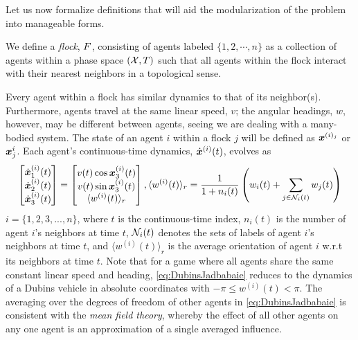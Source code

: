 Let us now formalize definitions that will aid the modularization of the problem into manageable forms.
%
\begin{definition}
	We define a \textit{flock}, $F$, consisting of agents labeled $\{1, 2, \cdots, n\}$  as a collection of agents within a phase space $(\mathcal{X}, T)$ such that all agents within the flock interact with their nearest neighbors in a topological sense.
	\label{def:flock}
\end{definition}
%
\begin{remark}
	Every agent within a flock has similar dynamics to that of its neighbor(s). Furthermore, agents travel at the same linear speed, $v$; the angular headings, $w$, however, may be different between agents, seeing we are dealing with a many-bodied system. The state of an agent $i$ within a flock $j$ will be defined as $\bm{x}^{(i)_j}$ or $\bm{x}^i_j$. Each agent's continuous-time dynamics, $\dot{\bm{x}}^{(i)}(t)$, evolves as
	\begin{align}
	\begin{bmatrix}
		 \dot{\bm{x}}^{(i)}_1(t) \\ \dot{\bm{x}}^{(i)}_2 (t) \\ \dot{\bm{x}}^{(i)}_3 (t)
		\end{bmatrix} 
		= \begin{bmatrix}
			v(t) \cos \bm{x}_3^{(i)}(t) \\ v(t)\sin \bm{x}_3^{(i)}(t) \\ \langle w^{(i)}(t) \rangle_r
		\end{bmatrix},
		 \langle w^{(i)}(t) \rangle_r = \dfrac{1}{1+n_i(t)}\left(w_i(t) + \sum_{j \in \mathcal{N}_i(t)}^{} w_j(t)\right) 
		\label{eq:DubinsJadbabaie}
	\end{align}
	 $i = \{1, 2, 3, ..., n\}$, where $t$ is the continuous-time index, $n_i(t)$ is the number of agent $i$'s neighbors at time $t$, $\mathcal{N}_i(t)$ denotes the sets of labels of  agent $i$'s neighbors at time $t$, and $\langle w^{(i)}(t) \rangle_r$ is the average orientation of agent $i$ w.r.t its neighbors at time $t$. Note that for a game where all agents share the same constant linear speed and heading, \eqref{eq:DubinsJadbabaie} reduces to the dynamics of a Dubins vehicle in absolute coordinates with $-\pi \le w^{(i)}(t) < \pi$. The averaging over the degrees of freedom of other agents in \eqref{eq:DubinsJadbabaie} is consistent with the \textit{mean field theory}, whereby the effect of all other agents on any one agent is an approximation of a single averaged influence.
\end{remark}

